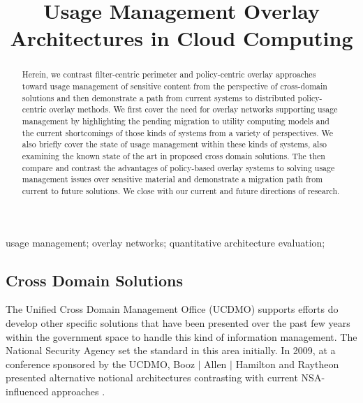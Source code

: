 \documentclass[10pt, conference, compsocconf]{IEEEtran}
\begin{document}
\title{Usage Management Overlay Architectures in Cloud Computing}

\author{
\and
{}
}

\maketitle

\begin{abstract}
Herein, we contrast filter-centric perimeter and policy-centric overlay approaches toward usage management of sensitive content from the perspective of cross-domain solutions and then demonstrate a path from current systems to distributed policy-centric overlay methods.  We first cover the need for overlay networks supporting usage management by highlighting the pending migration to utility computing models and the current shortcomings of those kinds of systems from a variety of perspectives.  We also briefly cover the state of usage management within these kinds of systems, also examining the known state of the art in proposed cross domain solutions.  The then compare and contrast the advantages of policy-based overlay systems to solving usage management issues over sensitive material and demonstrate a migration path from current to future solutions.  We close with our current and future directions of research. 
\end{abstract}

\begin{IEEEkeywords}
usage management; overlay networks; quantitative architecture evaluation;

\end{IEEEkeywords}

\IEEEpeerreviewmaketitle




\subsection{Cross Domain Solutions}
The Unified Cross Domain Management Office (UCDMO) supports efforts do develop other specific solutions that have been presented over the past few years within the government space to handle this kind of information management.  The National Security Agency set the standard in this area initially.  In 2009, at a conference sponsored by the UCDMO, Booz $\mid$ Allen $\mid$ Hamilton and Raytheon presented alternative notional architectures contrasting with current NSA-influenced approaches \cite{proposal:nsa-arch,proposal:gig-arch,proposal:bah-arch,proposal:raytheon-arch}.
\end{document}
